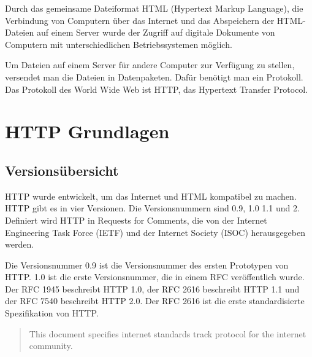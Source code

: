 \documentclass{llncs}
\begin{document}
Durch das gemeinsame Dateiformat HTML (Hypertext Markup Language), die Verbindung von Computern über das Internet und das Abspeichern der HTML-Dateien auf einem Server wurde der Zugriff auf digitale Dokumente von Computern mit unterschiedlichen Betriebssystemen möglich.

Um Dateien auf einem Server für andere Computer zur Verfügung zu stellen, versendet man die Dateien in Datenpaketen. Dafür benötigt man ein Protokoll. Das Protokoll des World Wide Web ist HTTP, das Hypertext Transfer Protocol.
\section{HTTP Grundlagen}
\subsection{Versionsübersicht}
HTTP wurde entwickelt, um das Internet und HTML kompatibel zu machen. HTTP gibt es in vier Versionen. Die Versionsnummern sind 0.9, 1.0 1.1 und 2. Definiert wird HTTP in Requests for Comments, die von der Internet Engineering Task Force (IETF) und der Internet Society (ISOC) herausgegeben werden.

Die Versionsnummer 0.9 ist die Versionsnummer des ersten Prototypen von HTTP. 1.0 ist die erste Versionsnummer, die in einem RFC veröffentlich wurde. Der RFC 1945 beschreibt HTTP 1.0, der RFC 2616 beschreibt HTTP 1.1 und der RFC 7540 beschreibt HTTP 2.0.
Der RFC 2616 ist die erste standardisierte Spezifikation von HTTP. \begin{quote}This document specifies internet standards track protocol for the internet community. \cite{Fielding1999} \end{quote}
\end{document}
